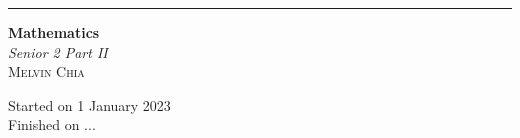 \documentclass{report}
\begin{document}
\begin{titlepage}
  \raggedleft{}
  \rule{1pt}{\textheight}
  \hspace{0.02\textwidth}
  \parbox[b]{0.75\textwidth}{

  {\fontsize{40}{60}\selectfont\bfseries Mathematics}\\[2\baselineskip]
  {\huge\textit{Senior 2 Part II}}\\[4\baselineskip]
  {\Large\textsc{Melvin Chia}}

  \vspace{0.5\textheight}

  {\noindent Started on 1 January 2023}\\[\baselineskip]
  {\noindent Finished on ...}\\[\baselineskip]}

\end{titlepage}

\doublespacing{}
\tableofcontents
\singlespacing{}
\newpage
\end{document}
